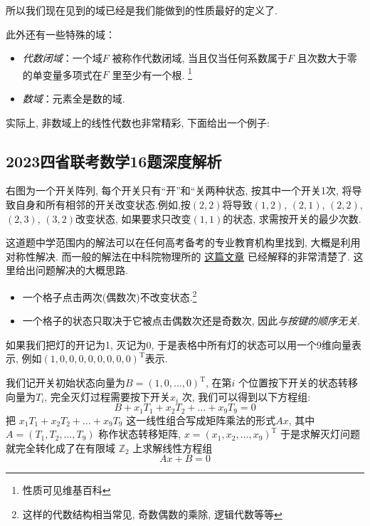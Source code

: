 所以我们现在见到的域已经是我们能做到的性质最好的定义了.

此外还有一些特殊的域：
\begin{itemize}
    \item \emph{代数闭域}：一个域\(F\) 被称作代数闭域, 当且仅当任何系数属于\(F\)
        且次数大于零的单变量多项式在\(F\) 里至少有一个根. \footnote{性质可见维基百科}
    \item \emph{数域}：元素全是数的域.
\end{itemize}
实际上, 非数域上的线性代数也非常精彩, 下面给出一个例子:

\subsection{2023四省联考数学16题深度解析}

\begin{problem}
    右图为一个开关阵列, 每个开关只有“开”和“关两种状态, 按其中一个开关1次,
    将导致自身和所有相邻的开关改变状态.例如,按\((2,2)\)将导致\((1,2)\), \((2,1)\),
    \((2,2)\), \((2,3)\),
    \((3,2)\)改变状态, 如果要求只改变\((1,1)\)的状态, 求需按开关的最少次数.
\end{problem}

这道题中学范围内的解法可以在任何高考备考的专业教育机构里找到, 大概是利用对称性解决. 而一般的解法在中科院物理所的
\href{https://mp.weixin.qq.com/s/k15Xlib2k9JOVrvBifQoiQ}{这篇文章}
已经解释的非常清楚了. 这里给出问题解决的大概思路.

\begin{itemize}
    \item 一个格子点击两次(偶数次)不改变状态.\footnote{这样的代数结构相当常见, 奇数偶数的乘除, 逻辑代数等等}
    \item 一个格子的状态只取决于它被点击偶数次还是奇数次, 因此\emph{与按键的顺序无关}.
\end{itemize}

如果我们把灯的开记为1, 灭记为0, 于是表格中所有灯的状态可以用一个9维向量表示,
例如\((1,0,0,0,0,0,0,0,0)^{\mathrm{T}}\)表示.

我们记开关初始状态向量为\(B=(1,0,\dots,0)^{\mathrm{T}}\), 在第\(i\)
个位置按下开关的状态转移向量为\(T_{i}\), 完全灭灯过程需要按下开关\(x_{i}\) 次, 我们可以得到以下方程组:
\[
    B+ x_{1}T_{1}+x_{2}T_{2}+\dots+x_{9}T_{9}=0
\]
把 \(x_{1}T_{1}+x_{2}T_{2}+\dots+x_{9}T_{9}\)
这一线性组合写成矩阵乘法的形式\(Ax\), 其中\(A=(T_{1}, T_{2}, \dots,
T_{9})\) 称作状态转移矩阵, \(x=(x_{1}, x_{2}, \dots, x_{9})^{\mathrm{T}}\)
于是求解灭灯问题就完全转化成了在有限域
\(\mathbb{Z}_{2}\) 上求解线性方程组\[
    Ax+B=0
\]

